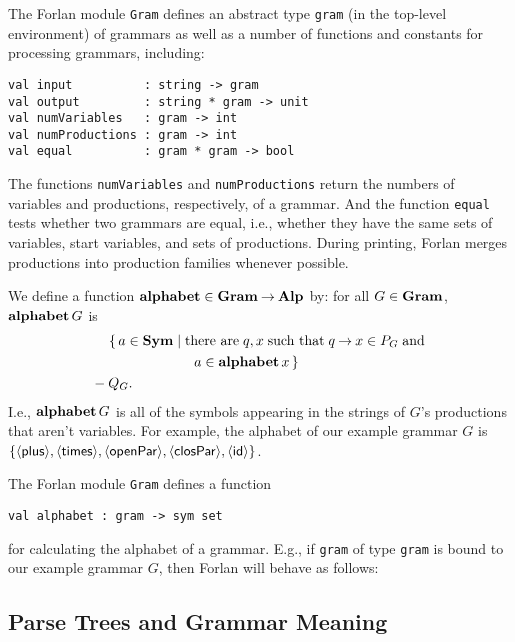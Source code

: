 The Forlan module \texttt{Gram} defines an abstract type \texttt{gram} (in
%
%
the top-level environment) of grammars as well as a number of
functions and constants for processing grammars, including:
\begin{verbatim}
val input          : string -> gram
val output         : string * gram -> unit 
val numVariables   : gram -> int
val numProductions : gram -> int
val equal          : gram * gram -> bool
\end{verbatim}
%
%
%
%
%
The functions \texttt{numVariables} and \texttt{numProductions} return
the numbers of variables and productions, respectively, of a grammar.
And the function \texttt{equal} tests whether two grammars are equal,
i.e., whether they have the same sets of variables, start variables,
and sets of productions.
During printing, Forlan merges productions into production families
whenever possible.

%
%
We define a function $\mathbf{alphabet}\in\mathbf{Gram}\mathbin{\to}\mathbf{Alp}$ by: for all $G\in\mathbf{Gram}$,
$\mathbf{alphabet}\,G$ is
\begin{align*}
&\quad\; \{\,a\in\mathbf{Sym}\mid\allowbreak\mbox{there are}\allowbreak\;q,x\;\allowbreak\mbox{such that}\allowbreak\;q\mathbin{\to} x\in P_G
\;\allowbreak\mbox{and}\allowbreak\; \\
&\hspace{2.6cm} a\in\mathbf{alphabet}\,x \,\} \\
&- Q_G .
\end{align*}
I.e., $\mathbf{alphabet}\,G$ is all of the symbols appearing in the strings of
$G$'s productions that aren't variables.  For example, the alphabet of
our example grammar $G$ is
$\{\mathsf{{\langle\mathsf{plus}\rangle},{\langle\mathsf{times}\rangle},{\langle\mathsf{openPar}\rangle},{\langle\mathsf{closPar}\rangle},{\langle\mathsf{id}\rangle}}\}$.

The Forlan module \texttt{Gram} defines a function
\begin{verbatim}
val alphabet : gram -> sym set
\end{verbatim}
%
for calculating the alphabet of a grammar.
E.g., if \texttt{gram} of type \texttt{gram} is bound to our example
grammar $G$, then Forlan will behave as follows:


\subsection{Parse Trees and Grammar Meaning}

